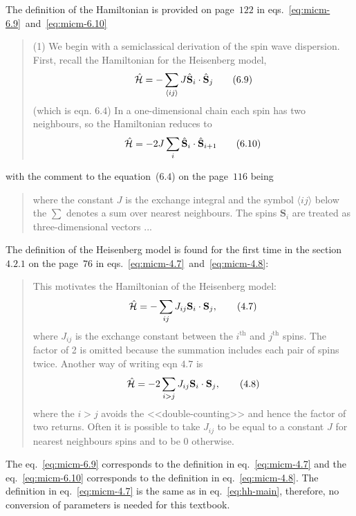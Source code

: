     The definition of the Hamiltonian is provided on page~$122$ in eqs.~\eqref{eq:micm-6.9}~and~\eqref{eq:micm-6.10}
    \begin{quote}
        (1) We begin with a semiclassical derivation of the spin wave dispersion.
        First, recall the Hamiltonian for the Heisenberg model,
        \begin{equation}
            \hat{\mathcal{H}} = -\sum_{\langle ij\rangle} J\hat{\mathbf{S}}_i \cdot \hat{\mathbf{S}}_j \label{eq:micm-6.9} \tag{6.9}
        \end{equation}
        (which is eqn. $6.4$) In a one-dimensional chain each spin has two neighbours, so the Hamiltonian reduces to
        \begin{equation}
            \hat{\mathcal{H}} = -2J\sum_{i} \hat{\mathbf{S}}_i \cdot \hat{\mathbf{S}}_{i+1} \label{eq:micm-6.10} \tag{6.10}
        \end{equation}
    \end{quote}
    with the comment to the equation~($6.4$) on the page~$116$ being
    \begin{quote}
        where the constant $J$ is the exchange integral and the symbol $\langle ij \rangle$ below the $\sum$ denotes a sum over nearest neighbours. 
        The spins $\mathbf{S}_i$ are treated as three-dimensional vectors ...
    \end{quote}

    The definition of the Heisenberg model is found for the first time in the section~$4.2.1$ on the page~$76$ in eqs.~\eqref{eq:micm-4.7}~and~\eqref{eq:micm-4.8}:
    \begin{quote}
        This motivates the Hamiltonian of the Heisenberg model:
        \begin{equation}
            \hat{\mathcal{H}} = -\sum_{ij}J_{ij}\mathbf{S}_i \cdot \mathbf{S}_j, \label{eq:micm-4.7} \tag{4.7}
        \end{equation}
        where $J_{ij}$ is the exchange constant between the $i^{\text{th}}$ and $j^{\text{th}}$ spins. 
        The factor of 2 is omitted because the summation includes each pair of spins twice. 
        Another way of writing eqn $4.7$ is 
        \begin{equation}
            \hat{\mathcal{H}} = -2\sum_{i>j}J_{ij}\mathbf{S}_i \cdot \mathbf{S}_j, \label{eq:micm-4.8} \tag{4.8}
        \end{equation}
        where the $i > j$ avoids the <<double-counting>> and hence the factor of two returns. 
        Often it is possible to take $J_{ij}$ to be equal to a constant $J$ for nearest neighbours spins and to be $0$ otherwise.
    \end{quote}
    The eq.~\eqref{eq:micm-6.9} corresponds to the definition in eq.~\eqref{eq:micm-4.7} 
    and the eq.~\eqref{eq:micm-6.10} corresponds to the definition in eq.~\eqref{eq:micm-4.8}. 
    The definition in eq.~\eqref{eq:micm-4.7} is the same as in eq.~\eqref{eq:hh-main}, 
    therefore, no conversion of parameters is needed for this textbook.

